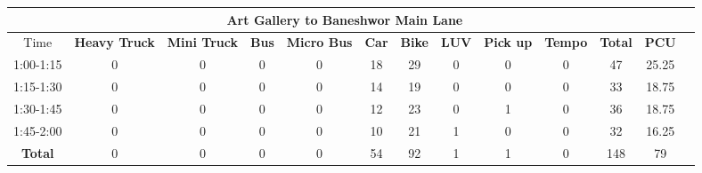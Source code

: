 \begin{landscape}
\begin{table}[h!]
\vspace{0.5cm}
\begin{tabular}{|c|c|c|c|c|c|c|c|c|c|c|c|c|}
    \hline
    \multicolumn{12}{|c|}{\textbf{Art Gallery to Baneshwor Main Lane}} \\
    \hline
        Time & \textbf{Heavy Truck} & \textbf{Mini Truck} & \textbf{Bus} & \textbf{Micro Bus} & \textbf{Car} & \textbf{Bike} & \textbf{LUV} & \textbf{Pick up} & \textbf{Tempo} & \textbf{\textbf{Total}} & \textbf{PCU} \\
    \hline
1:00-1:15	&0	&0	&0	&0	&18	&29	&0	&0	&0	&47	&25.25 \\ \hline
1:15-1:30	&0	&0	&0	&0	&14	&19	&0	&0	&0	&33	&18.75 \\ \hline
1:30-1:45	&0	&0	&0	&0	&12	&23	&0	&1	&0	&36	&18.75 \\ \hline
1:45-2:00	&0	&0	&0	&0	&10	&21	&1	&0	&0	&32	&16.25 \\ \hline
\textbf{Total}	&0	&0	&0	&0	&54	&92	&1	&1	&0	&148	&79 \\ \hline

\end{tabular}

\end{table}
\end{landscape}

